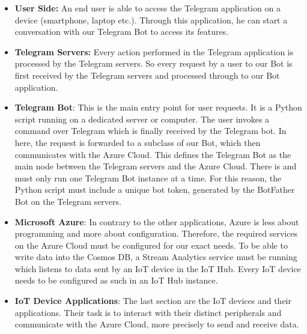\documentclass[a4paper]{article}
\begin{document}
		\begin{itemize}[itemsep=1em]
			\item \textbf{User Side:} An end user is able to access the Telegram application on a device (smartphone, laptop etc.). 
			Through this application, he can start a conversation with our Telegram Bot to access its features.
			
			\item \textbf{Telegram Servers:} Every action performed in the Telegram application is processed by the Telegram servers.
			So every request by a user to our Bot is first received by the Telegram servers and processed through to our Bot application.
			
			\item \textbf{Telegram Bot}: This is the main entry point for user requests.
			It is a Python script running on a dedicated server or computer.
			The user invokes a command over Telegram which is finally received by the Telegram bot.
			In here, the request is forwarded to a subclass of our Bot, which then communicates with the Azure Cloud.
			This defines the Telegram Bot as the main node between the Telegram servers and the Azure Cloud.
			There is and must only run one Telegram Bot instance at a time.
			For this reason, the Python script must include a unique bot token, generated by the BotFather Bot on the Telegram servers.
			
			\item \textbf{Microsoft Azure}:	In contrary to the other applications, Azure is less about programming and more about configuration.
			Therefore, the required services on the Azure Cloud must be configured for our exact needs.
			To be able to write data into the Cosmos DB, a Stream Analytics service must be running which listens to data sent by an IoT device in the IoT Hub.
			Every IoT device needs to be configured as such in an IoT Hub instance.
			
			\item \textbf{IoT Device Applications}: The last section are the IoT devices and their applications. 
			Their task is to interact with their distinct peripherals and communicate with the Azure Cloud, more precisely to send and receive data.
		\end{itemize}
	
		\newpage
	
\end{document}
